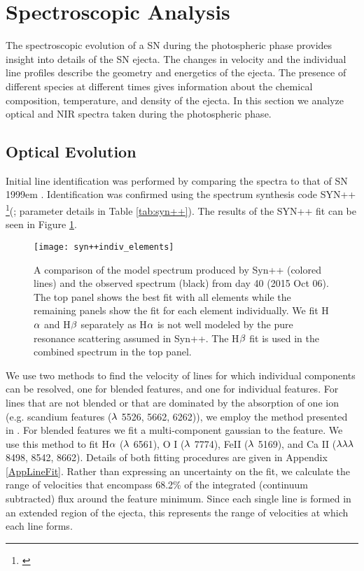 \documentclass[a4paper,fleqn,usenatbib]{mnras}
\begin{document}
\section{Spectroscopic Analysis} \label{sec:SpecEvolve}
The spectroscopic evolution of a SN during the photospheric phase provides insight into details of the SN ejecta.
The changes in velocity and the individual line profiles describe the geometry and energetics of the ejecta. 
The presence of different species at different times gives information about the chemical composition, temperature, and density of the ejecta.
In this section we analyze optical and NIR spectra taken during the photospheric phase.
\subsection{Optical Evolution} \label{OpticalEvolve}
Initial line identification was performed by comparing the spectra to that of SN 1999em \citep{2001leonard}. 
Identification was confirmed using the spectrum synthesis code SYN++ \footnote{\citet{2013thomas}}(\citealt{2011thomas}; parameter details in Table \ref{tab:syn++}). 
The results of the SYN++ fit can be seen in Figure \ref{fig:syn++}.
\begin{figure*}
\begin{center}
\texttt{[image: syn++indiv\_elements]} %
\caption{A comparison of the model spectrum produced by Syn++ (colored lines) and the observed spectrum (black) from day 40 (2015 Oct 06).
The top panel shows the best fit with all elements while the remaining panels show the fit for each element individually.
We fit H$\rm{\alpha}$ and H$\rm{\beta}$ separately as H$\rm{\alpha}$ is not well modeled by the pure resonance scattering assumed in Syn++.
The H$\rm{\beta}$ fit is used in the combined spectrum in the top panel.}
\label{fig:syn++}
\end{center}
\end{figure*}

We use two methods to find the velocity of lines for which individual components can be resolved, one for blended features, and one for individual features.
For lines that are not blended or that are dominated by the absorption of one ion (e.g. scandium features ($\rm{\lambda}$ 5526, 5662, 6262)), we employ the method presented in \citet{2012silverman}. 
For blended features we fit a multi-component gaussian to the feature.
We use this method to fit H$\rm{\alpha}$ ($\rm{\lambda}$ 6561), O I ($\rm{\lambda}$ 7774), FeII ($\rm{\lambda}$ 5169), and Ca II ($\rm{\lambda\lambda\lambda}$ 8498, 8542, 8662). 
Details of both fitting procedures are given in Appendix \ref{AppLineFit}.
Rather than expressing an uncertainty on the fit, we calculate the range of velocities that encompass 68.2\% of the integrated (continuum subtracted) flux around the feature minimum.
Since each single line is formed in an extended region of the ejecta, this represents the range of velocities at which each line forms.
\end{document}
